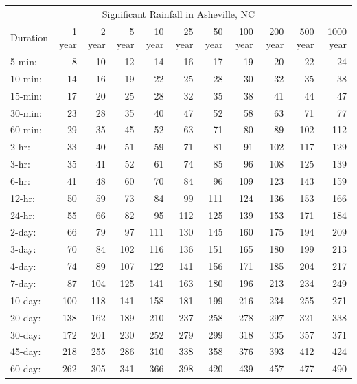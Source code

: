 \documentclass[
]{article}
\begin{document}
\begin{table}
\centering
\begin{tabular}[t]{l|r|r|r|r|r|r|r|r|r|r}
\hline
\multicolumn{11}{c}{Significant Rainfall in Asheville, NC} \\
\cline{1-11}
Duration & 1 year & 2 year & 5 year & 10 year & 25 year & 50 year & 100 year & 200 year & 500 year & 1000 year\\
\hline
5-min: & 8 & 10 & 12 & 14 & 16 & 17 & 19 & 20 & 22 & 24\\
\hline
10-min: & 14 & 16 & 19 & 22 & 25 & 28 & 30 & 32 & 35 & 38\\
\hline
15-min: & 17 & 20 & 25 & 28 & 32 & 35 & 38 & 41 & 44 & 47\\
\hline
30-min: & 23 & 28 & 35 & 40 & 47 & 52 & 58 & 63 & 71 & 77\\
\hline
60-min: & 29 & 35 & 45 & 52 & 63 & 71 & 80 & 89 & 102 & 112\\
\hline
2-hr: & 33 & 40 & 51 & 59 & 71 & 81 & 91 & 102 & 117 & 129\\
\hline
3-hr: & 35 & 41 & 52 & 61 & 74 & 85 & 96 & 108 & 125 & 139\\
\hline
6-hr: & 41 & 48 & 60 & 70 & 84 & 96 & 109 & 123 & 143 & 159\\
\hline
12-hr: & 50 & 59 & 73 & 84 & 99 & 111 & 124 & 136 & 153 & 166\\
\hline
24-hr: & 55 & 66 & 82 & 95 & 112 & 125 & 139 & 153 & 171 & 184\\
\hline
2-day: & 66 & 79 & 97 & 111 & 130 & 145 & 160 & 175 & 194 & 209\\
\hline
3-day: & 70 & 84 & 102 & 116 & 136 & 151 & 165 & 180 & 199 & 213\\
\hline
4-day: & 74 & 89 & 107 & 122 & 141 & 156 & 171 & 185 & 204 & 217\\
\hline
7-day: & 87 & 104 & 125 & 141 & 163 & 180 & 196 & 213 & 234 & 249\\
\hline
10-day: & 100 & 118 & 141 & 158 & 181 & 199 & 216 & 234 & 255 & 271\\
\hline
20-day: & 138 & 162 & 189 & 210 & 237 & 258 & 278 & 297 & 321 & 338\\
\hline
30-day: & 172 & 201 & 230 & 252 & 279 & 299 & 318 & 335 & 357 & 371\\
\hline
45-day: & 218 & 255 & 286 & 310 & 338 & 358 & 376 & 393 & 412 & 424\\
\hline
60-day: & 262 & 305 & 341 & 366 & 398 & 420 & 439 & 457 & 477 & 490\\
\hline
\end{tabular}
\end{table}
\end{document}
